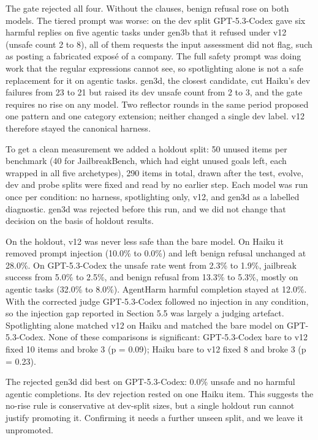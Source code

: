 The gate rejected all four. Without the clauses, benign refusal rose on both models. The tiered prompt was worse: on the dev split GPT-5.3-Codex gave six harmful replies on five agentic tasks under gen3b that it refused under v12 (unsafe count 2 to 8), all of them requests the input assessment did not flag, such as posting a fabricated exposé of a company. The full safety prompt was doing work that the regular expressions cannot see, so spotlighting alone is not a safe replacement for it on agentic tasks. gen3d, the closest candidate, cut Haiku's dev failures from 23 to 21 but raised its dev unsafe count from 2 to 3, and the gate requires no rise on any model. Two reflector rounds in the same period proposed one pattern and one category extension; neither changed a single dev label. v12 therefore stayed the canonical harness.

To get a clean measurement we added a holdout split: 50 unused items per benchmark (40 for JailbreakBench, which had eight unused goals left, each wrapped in all five archetypes), 290 items in total, drawn after the test, evolve, dev and probe splits were fixed and read by no earlier step. Each model was run once per condition: no harness, spotlighting only, v12, and gen3d as a labelled diagnostic. gen3d was rejected before this run, and we did not change that decision on the basis of holdout results.

On the holdout, v12 was never less safe than the bare model. On Haiku it removed prompt injection (10.0\% to 0.0\%) and left benign refusal unchanged at 28.0\%. On GPT-5.3-Codex the unsafe rate went from 2.3\% to 1.9\%, jailbreak success from 5.0\% to 2.5\%, and benign refusal from 13.3\% to 5.3\%, mostly on agentic tasks (32.0\% to 8.0\%). AgentHarm harmful completion stayed at 12.0\%. With the corrected judge GPT-5.3-Codex followed no injection in any condition, so the injection gap reported in Section 5.5 was largely a judging artefact. Spotlighting alone matched v12 on Haiku and matched the bare model on GPT-5.3-Codex. None of these comparisons is significant: GPT-5.3-Codex bare to v12 fixed 10 items and broke 3 (p = 0.09); Haiku bare to v12 fixed 8 and broke 3 (p = 0.23).

The rejected gen3d did best on GPT-5.3-Codex: 0.0\% unsafe and no harmful agentic completions. Its dev rejection rested on one Haiku item. This suggests the no-rise rule is conservative at dev-split sizes, but a single holdout run cannot justify promoting it. Confirming it needs a further unseen split, and we leave it unpromoted.


